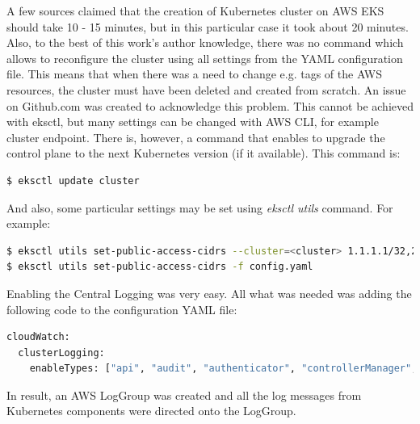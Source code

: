 A few sources claimed that the creation of Kubernetes cluster on AWS EKS should take 10 - 15 minutes\cite{eks-blog-part1}\cite{eks-blog2}, but in this particular case it took about 20 minutes. Also, to the best of this work’s author knowledge, there was no command which allows to reconfigure the cluster using all settings from the YAML configuration file. This means that when there was a need to change e.g. tags of the AWS resources, the cluster must have been deleted and created from scratch. An issue on Github.com was created to acknowledge this problem\cite{eksctl-no-config-update}. This cannot be achieved with eksctl, but many settings can be changed with AWS CLI, for example cluster endpoint\cite{eks-cluster-endpoint}. There is, however, a command that enables to upgrade the control plane to the next Kubernetes version (if it available). This command is:
\begin{lstlisting}[basicstyle=\tiny,caption={Updating eksctl cluster},captionpos=b,language=Bash,xleftmargin=1cm]
$ eksctl update cluster
\end{lstlisting}
And also, some particular settings may be set using \textit{eksctl utils} command. For example\cite{eksctl-net}:
\begin{lstlisting}[basicstyle=\tiny,caption={Updating eksctl cluster configuration},captionpos=b,language=Bash,xleftmargin=1cm]
$ eksctl utils set-public-access-cidrs --cluster=<cluster> 1.1.1.1/32,2.2.2.0/24
$ eksctl utils set-public-access-cidrs -f config.yaml
\end{lstlisting}


Enabling the Central Logging was very easy. All what was needed was adding the following code to the configuration YAML file:
\begin{lstlisting}[basicstyle=\tiny,caption={Enabling logging in eksctl cluster},captionpos=b,language=Bash,xleftmargin=1cm]
cloudWatch:
  clusterLogging:
    enableTypes: ["api", "audit", "authenticator", "controllerManager", "scheduler"]
\end{lstlisting}

In result, an AWS LogGroup was created and all the log messages from Kubernetes components were directed onto the LogGroup.

